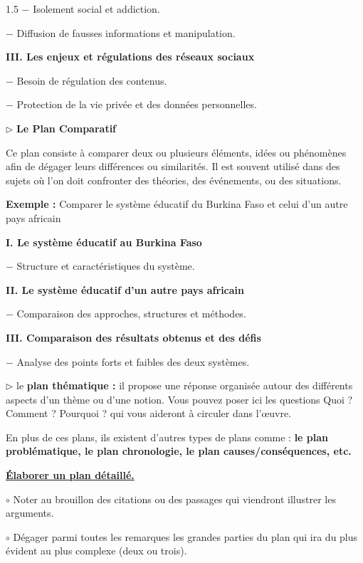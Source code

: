 \documentclass[12pt]{article}
\begin{document}
\begin{spacing}{1.5}
$-$ Isolement social et addiction.

$-$ Diffusion de fausses informations et manipulation.

\textbf{III. Les enjeux et régulations des réseaux sociaux}

$-$ Besoin de régulation des contenus.

$-$ Protection de la vie privée et des données personnelles.

\quad




$\rhd$ \textbf{ Le Plan Comparatif}

Ce plan consiste à comparer deux ou plusieurs éléments, idées ou phénomènes afin de dégager leurs différences ou similarités. Il est souvent utilisé dans des sujets où l'on doit confronter des théories, des événements, ou des situations.

\textbf{Exemple : }Comparer le système éducatif du Burkina Faso et celui d'un autre pays africain

\textbf{I. Le système éducatif au Burkina Faso}

$-$ Structure et caractéristiques du système.

\textbf{II. Le système éducatif d'un autre pays africain}

$-$ Comparaison des approches, structures et méthodes.

\textbf{III. Comparaison des résultats obtenus et des défis}

$-$ Analyse des points forts et faibles des deux systèmes.



$\rhd$ le \textbf{plan thématique :} il propose une réponse organisée autour des différents aspects d'un thème ou d'une notion. Vous pouvez poser ici les questions Quoi ? Comment ? Pourquoi ? qui vous aideront 
à circuler dans l'œuvre.

 \vspace*{1.5cm}
 
 En plus de ces plans, ils existent d'autres types de plans comme : \textbf{le plan problématique, le plan chronologie, le plan causes/conséquences, etc. }

\underline{\textbf{Élaborer un plan détaillé.}}
 
$\circ$ Noter au brouillon des citations ou des passages qui viendront illustrer les arguments. 

$\circ$ Dégager parmi toutes les remarques les grandes parties du plan qui ira du plus évident au 
plus complexe (deux ou trois). 


\end{spacing}
\end{document}

